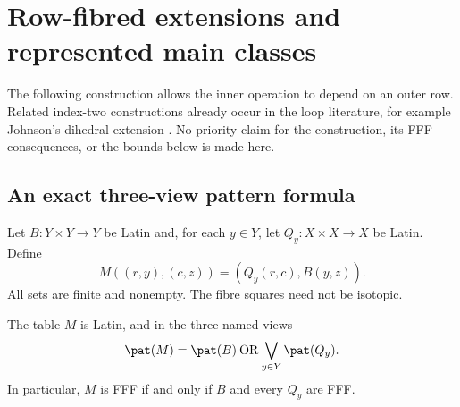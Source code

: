 \section{Row-fibred extensions and represented main classes}
\label{sec:fibred-growth}

The following construction allows the inner operation to depend on an
outer row. Related index-two constructions already occur in the loop
literature, for example Johnson's dihedral extension
\cite{Johnson2006Ward}. No priority claim for the construction, its FFF
consequences, or the bounds below is made here.

\subsection{An exact three-view pattern formula}

Let $B:Y\times Y\to Y$ be Latin and, for each $y\in Y$, let
$Q_y:X\times X\to X$ be Latin. Define
\begin{equation}
 M((r,y),(c,z))=(Q_y(r,c),B(y,z)).
 \label{eq:row-fibred}
\end{equation}
All sets are finite and nonempty. The fibre squares need not be isotopic.

\begin{theorem}
\label{thm:row-fibred-pattern}
The table $M$ is Latin, and in the three named views
\[
 \pat(M)=\pat(B)\mathbin{\mathrm{OR}}
                  \bigvee_{y\in Y}\pat(Q_y).
\]
In particular, $M$ is FFF if and only if $B$ and every $Q_y$ are FFF.
\end{theorem}

